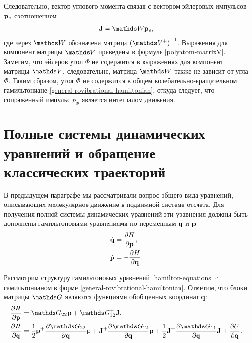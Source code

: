 Следовательно, вектор углового момента связан с вектором эйлеровых импульсов $\mathbf{p}_e$ соотношением
\begin{gather}
    \mf{J} = \bbW \pe, \label{polyatom-angular-momentum-euler-momenta}
\end{gather}
%
где через $\bbW$ обозначена матрица $\lb \bbV^{+} \rb^{-1}$. Выражения для компонент матрицы $\bbV$ приведены в формуле \eqref{polyatom-matrixV}. Заметим, что эйлеров угол $\Phi$ не содержится в выражениях для компонент матрицы $\bbV$, следовательно, матрица $\bbW$ также не зависит от угла $\Phi$. Таким образом, угол $\Phi$ не содержится в общем колебательно-вращательном гамильтониане \eqref{general-rovibrational-hamiltonian}, откуда следует, что сопряженный импульс $p_\Phi$ является интегралом движения. \par

\section{Полные системы динамических уравнений и обращение \\классических траекторий} \label{section:dynamic-equations}

В предыдущем параграфе мы рассматривали вопрос общего вида уравнений, описывающих молекулярное движение в подвижной системе отсчета. Для получения полной системы динамических уравнений эти уравнения должны быть дополнены гамильтоновыми уравнениями по переменным $\mathbf{q}$ и $\mathbf{p}$
\begin{gather}
    \begin{aligned}
        \dot{\mathbf{q}} &= \frac{\partial H}{\partial \mathbf{p}}, \\
        \dot{\mathbf{p}} &= -\frac{\partial H}{\partial \mathbf{q}}.
    \end{aligned} \label{hamilton-equations}
\end{gather}

Рассмотрим структуру гамильтоновых уравнений \eqref{hamilton-equations} с гамильтонианом в форме \eqref{general-rovibrational-hamiltonian}. Отметим, что блоки матрицы $\bbG$ являются функциями обобщенных координат $\mathbf{q}$:
\begin{gather}
    \begin{aligned}
        \frac{\partial H}{\partial \mf{p}} &= \bbG_{22} \mf{p} + \bbG_{12}^{+} \mf{J}, \\
        \frac{\partial H}{\partial \mf{q}} &= \frac{1}{2} \mf{p}^+ \frac{\partial \bbG_{22}}{\partial \mf{q}} \mf{p} + \mf{J}^+ \frac{\partial \bbG_{12}}{\partial \mf{q}} \mf{p} + \frac{1}{2} \mf{J}^+ \frac{\partial \bbG_{11}}{\partial \mf{q}} \mf{J} + \frac{\partial U}{\partial \mf{q}}.
    \end{aligned} \label{hamilton-equations1}
\end{gather}

